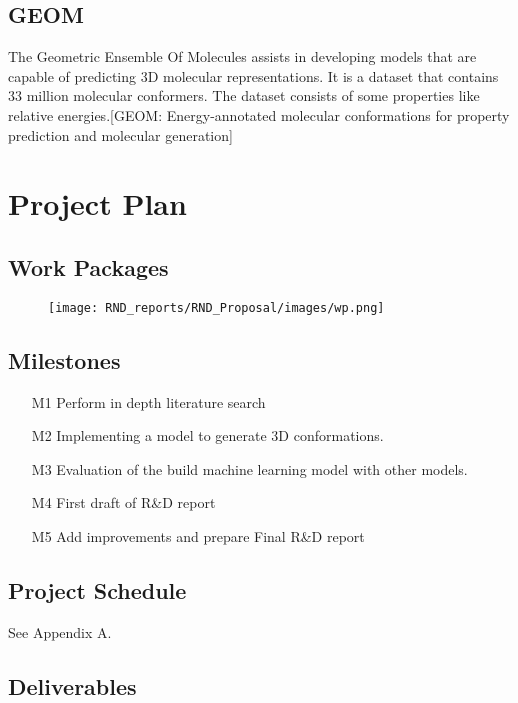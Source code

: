 \documentclass[rnd]{mas_proposal}
\begin{document}
     \subsection{GEOM}
     The Geometric Ensemble Of Molecules assists in developing models that are capable of predicting 3D molecular representations. It is a dataset that contains 33 million molecular conformers. The dataset consists of some properties like relative energies.[GEOM: Energy-annotated molecular conformations for property prediction and molecular generation]


\section{Project Plan}

\subsection{Work Packages}

\begin{figure}[!ht]
    \caption{}
    \texttt{[image: RND\_reports/RND\_Proposal/images/wp.png]}
    \label{}
\end{figure}

\FloatBarrier


\subsection{Milestones}
\begin{enumerate}
    \item[M1] Perform in depth literature search 
    \item[M2] Implementing a model to generate 3D conformations.
    \item[M3] Evaluation of the build machine learning model with other models.
    \item[M4] First draft of R\&D report
    \item[M5] Add improvements and prepare Final R\&D report
\end{enumerate}

\subsection{Project Schedule}
See Appendix A.

\subsection{Deliverables}
\end{document}
